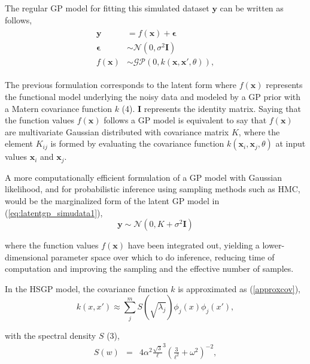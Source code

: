 \documentclass[]{interact}
\theoremstyle{plain}%
\theoremstyle{definition}
\theoremstyle{remark}
\begin{document}
The regular GP model for fitting this simulated dataset $\mathbf{y}$ can be written as follows,
%
\begin{eqnarray}\label{eq:latentgp_simudata1}
\begin{split}
\mathbf{y} &= f(\mathbf{x}) + \boldsymbol{\epsilon} \\
\boldsymbol{\epsilon} &\sim \mathcal{N}(0, \sigma^2  \mathbf{I}) \\
f(\mathbf{x}) &\sim \mathcal{GP}(0, k(\mathbf{x}, \mathbf{x}', \theta)),
\end{split}
\end{eqnarray}

\noindent The previous formulation corresponds to the latent form where $f(\mathbf{x})$ represents the functional model underlying the noisy data and modeled by a GP prior with a Matern covariance function $k$ (4). $\mathbf{I}$ represents the identity matrix. Saying that the function values $f(\mathbf{x})$ follows a GP model is equivalent to say that $f(\mathbf{x})$ are multivariate Gaussian distributed with covariance matrix $K$, where the element $K_{ij}$ is formed by evaluating the covariance function $k(\mathbf{x}_i,\mathbf{x}_j,\theta)$ at input values $\mathbf{x}_i$ and $\mathbf{x}_j$.
 
A more computationally efficient formulation of a GP model with Gaussian likelihood, and for probabilistic inference using sampling methods such as HMC, would be the marginalized form of the latent GP model in (\ref{eq:latentgp_simudata1}),
%
\begin{equation*}\label{eq:marginalizedgp_simudata1}
\mathbf{y} \sim \mathcal{N}(0, K + \sigma^2 \mathbf{I} )
\end{equation*}

\noindent where the function values $f(\mathbf{x})$ have been integrated out, yielding a lower-dimensional parameter space over which to do inference, reducing time of computation and improving the sampling and the effective number of samples.

In the HSGP model, the covariance function $k$ is approximated as (\ref{approxcov}),
%
\begin{equation*}
k(x,x') \approx \sum_{j}^{m}S(\sqrt{\lambda_j}) \phi_j(x) \phi_j(x'),
\end{equation*} 

\noindent with the spectral density $S$ (3),
%
\begin{eqnarray*}
S(w)&=& 4\alpha^2 \frac{\sqrt{3}}{\ell}^{3}(\frac{3}{\ell^2} + \omega^2)^{-2},  
\end{eqnarray*}
\end{document}
